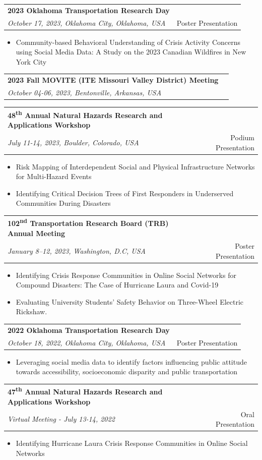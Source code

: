 \documentclass[a4paper,11pt]{article}
\makeatletter
\newcommand{\resumeProject}[4]{
\vspace{0.5mm}\item
    \begin{tabular*}{0.98\textwidth}[t]{l@{\extracolsep{\fill}}r}
        \textbf{#1} & \textit{\footnotesize{#3}} \\
        \footnotesize{\textit{#2}} & \footnotesize{#4}
    \end{tabular*}
    \vspace{-2.4mm}
}
\newcommand{\resumeItemListStart}{\begin{itemize}[leftmargin=*,labelsep=1mm,itemsep=0.5mm]}
\newcommand{\resumeItemListEnd}{\end{itemize}\vspace{-2mm}}
\makeatother
\begin{document}
\resumeProject
  {\textcolor{mycolor}{2023 Oklahoma Transportation Research Day}}
  {October 17, 2023, Oklahoma City, Oklahoma, USA}{}{{Poster Presentation}}
\resumeItemListStart
    \item Community-based Behavioral Understanding of Crisis Activity Concerns using Social Media Data: A Study on the 2023 Canadian Wildfires in New York City
\resumeItemListEnd

\resumeProject
  {\textcolor{mycolor}{2023 Fall MOVITE (ITE Missouri Valley District) Meeting}}
  {October 04-06, 2023, Bentonville, Arkansas, USA}{}{{}}

\resumeProject
  {\textcolor{mycolor}{48\textsuperscript{th} Annual Natural Hazards Research and Applications Workshop}}
  {July 11-14, 2023, Boulder, Colorado, USA}{}{{Podium Presentation}}
\resumeItemListStart
    \item Risk Mapping of Interdependent Social and Physical Infrastructure Networks for Multi-Hazard Events
    \item Identifying Critical Decision Trees of First Responders in Underserved Communities During Disasters
\resumeItemListEnd


\resumeProject
  {\textcolor{mycolor}{102\textsuperscript{nd} Transportation Research Board (TRB) Annual Meeting}}
  {January 8–12, 2023, Washington, D.C, USA}{}{{Poster Presentation}}
\resumeItemListStart
    \item Identifying Crisis Response Communities in Online Social Networks for Compound Disasters: The Case of Hurricane Laura and Covid-19
    \item Evaluating University Students’ Safety Behavior on Three-Wheel Electric Rickshaw.
\resumeItemListEnd

\resumeProject
  {\textcolor{mycolor}{2022 Oklahoma Transportation Research Day}}
  {October 18, 2022, Oklahoma City, Oklahoma, USA}{}{{Poster Presentation}}
\resumeItemListStart
    \item Leveraging social media data to identify factors influencing public attitude towards accessibility, socioeconomic disparity and public transportation
\resumeItemListEnd

\resumeProject
  {\textcolor{mycolor}{47\textsuperscript{th} Annual Natural Hazards Research and Applications Workshop}}
  {Virtual Meeting - July 13-14, 2022}{}{{Oral Presentation}}
\resumeItemListStart
  \item Identifying Hurricane Laura Crisis Response Communities in Online Social Networks
\resumeItemListEnd
\end{document}
